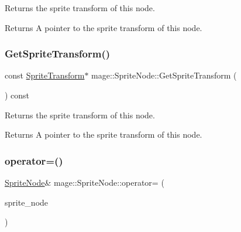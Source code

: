 Returns the sprite transform of this node.

\begin{DoxyReturn}{Returns}
A pointer to the sprite transform of this node. 
\end{DoxyReturn}
\hypertarget{classmage_1_1_sprite_node_a021d8d7d51a05330bfa6d034482988a0}{}\label{classmage_1_1_sprite_node_a021d8d7d51a05330bfa6d034482988a0} 
\subsubsection{\texorpdfstring{Get\+Sprite\+Transform()}{GetSpriteTransform()}\hspace{0.1cm}{\footnotesize\ttfamily [2/2]}}
{\footnotesize\ttfamily const \hyperlink{structmage_1_1_sprite_transform}{Sprite\+Transform}$\ast$ mage\+::\+Sprite\+Node\+::\+Get\+Sprite\+Transform (\begin{DoxyParamCaption}{ }\end{DoxyParamCaption}) const\hspace{0.3cm}{\ttfamily [noexcept]}}

Returns the sprite transform of this node.

\begin{DoxyReturn}{Returns}
A pointer to the sprite transform of this node. 
\end{DoxyReturn}
\hypertarget{classmage_1_1_sprite_node_a009228c9f53671a4275534ceb7733bd0}{}\label{classmage_1_1_sprite_node_a009228c9f53671a4275534ceb7733bd0} 
\subsubsection{\texorpdfstring{operator=()}{operator=()}\hspace{0.1cm}{\footnotesize\ttfamily [1/2]}}
{\footnotesize\ttfamily \hyperlink{classmage_1_1_sprite_node}{Sprite\+Node}\& mage\+::\+Sprite\+Node\+::operator= (\begin{DoxyParamCaption}\item[{const \hyperlink{classmage_1_1_sprite_node}{Sprite\+Node} \&}]{sprite\+\_\+node }\end{DoxyParamCaption})\hspace{0.3cm}{\ttfamily [delete]}}

